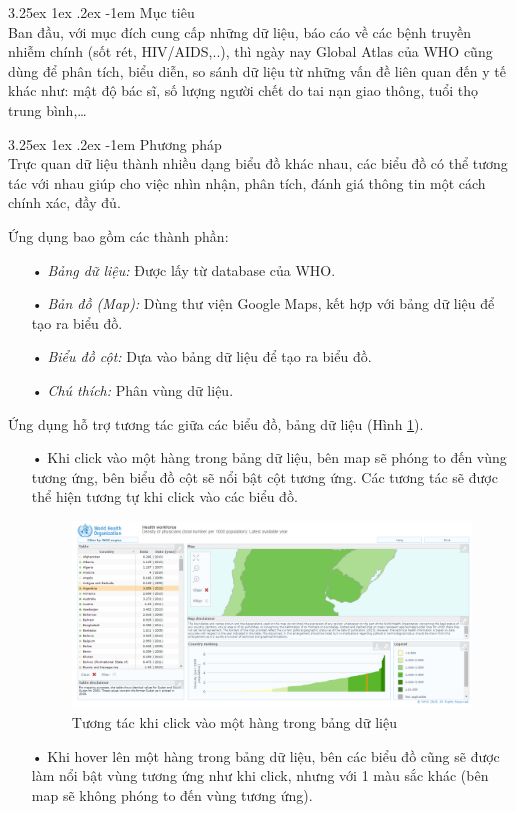 \documentclass[12pt,a4paper]{article}
\makeatletter
\newcommand{\myparagraph}[1]{\paragraph{#1}\mbox{}\\} %
\renewcommand\paragraph{\@startsection{paragraph}{5}{\z@}%
  {3.25ex \@plus1ex \@minus.2ex}%
  {-1em}%
  {\normalfont\normalsize\bfseries}}
\makeatother
\begin{document}
\myparagraph{Mục tiêu}
Ban đầu, với mục đích cung cấp những dữ liệu, báo cáo về các bệnh truyền nhiễm chính (sốt rét, HIV/AIDS,..), thì ngày nay Global Atlas của WHO cũng dùng để phân tích, biểu diễn, so sánh dữ liệu từ những vấn đề liên quan đến y tế khác như: mật độ bác sĩ, số lượng người chết do tai nạn giao thông, tuổi thọ trung bình,… 

\myparagraph{Phương pháp}
Trực quan dữ liệu thành nhiều dạng biểu đồ khác nhau, các biểu đồ có thể tương tác với nhau giúp cho việc nhìn nhận, phân tích, đánh giá thông tin một cách chính xác, đầy đủ.

Ứng dụng\cite{ghaex} bao gồm các thành phần:
\begin{itemize}
\item[•] \emph{Bảng dữ liệu:} Được lấy từ database của WHO.
\item[•] \emph{Bản đồ (Map):} Dùng thư viện Google Maps, kết hợp với bảng dữ liệu để tạo ra biểu đồ.
\item[•] \emph{Biểu đồ cột:} Dựa vào bảng dữ liệu để tạo ra biểu đồ.
\item[•] \emph{Chú thích:} Phân vùng dữ liệu.
\end{itemize}

Ứng dụng hỗ trợ tương tác giữa các biểu đồ, bảng dữ liệu (Hình \ref{fig:clickatlas}).

\begin{itemize}
\item[•] Khi click vào một hàng trong bảng dữ liệu, bên map sẽ phóng to đến vùng tương ứng, bên biểu đồ cột sẽ nổi bật cột tương ứng. Các tương tác sẽ được thể hiện tương tự khi click vào các biểu đồ.

\begin{figure}[!h]
    \begin{center}
    \includegraphics[scale=.4]{image/clickatlas}
    \caption{Tương tác khi click vào một hàng trong bảng dữ liệu}
    \label{fig:clickatlas}
    \end{center}
\end{figure}

\item[•] Khi hover lên một hàng trong bảng dữ liệu, bên các biểu đồ cũng sẽ được làm nổi bật vùng tương ứng như khi click, nhưng với 1 màu sắc khác (bên map sẽ không phóng to đến vùng tương ứng).
\end{itemize}
\end{document}
